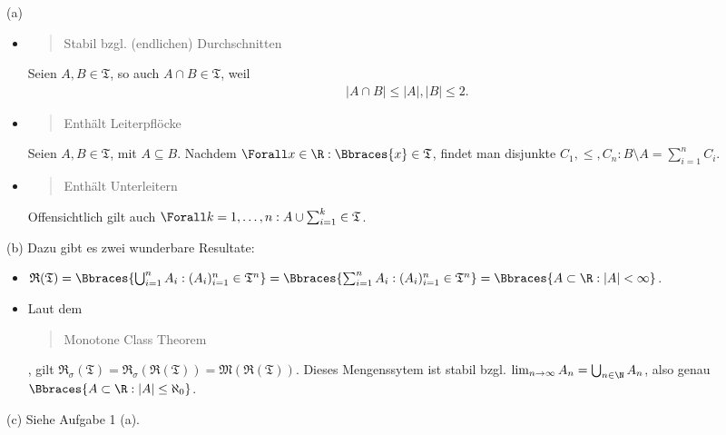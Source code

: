 \begin{solution}

(a) \phantom{}

\begin{itemize}

  \item \blockquote{Stabil bzgl. (endlichen) Durchschnitten}: Seien $A, B \in \mathfrak{T}$, so auch $A \cap B \in \mathfrak{T}$, weil
  \begin{align*}
    |A \cap B| \leq |A|, |B| \leq 2.
  \end{align*}

  \item \blockquote{Enthält Leiterpflöcke} Seien $A, B \in \mathfrak{T}$, mit $A \subseteq B$. Nachdem $\Forall x \in \R: \Bbraces{x} \in \mathfrak{T}$, findet man disjunkte $C_1, \leq, C_n: B \setminus A = \sum_{i=1}^n C_i$.

  \item \blockquote{Enthält Unterleitern} Offensichtlich gilt auch $\Forall k = 1, \ldots, n: A \cup \sum_{i=1}^k \in \mathfrak{T}$.

\end{itemize}

(b) Dazu gibt es zwei wunderbare Resultate:

\begin{itemize}

  \item $\mathfrak{R}(\mathfrak{T})
  = \Bbraces{\bigcup_{i=1}^n A_i: (A_i)_{i=1}^n \in \mathfrak{T}^n}
  = \Bbraces{\sum   _{i=1}^n A_i: (A_i)_{i=1}^n \in \mathfrak{T}^n}
  = \Bbraces{A \subset \R: |A| < \infty}$.

  \item Laut dem \blockquote{Monotone Class Theorem}, gilt
  $\mathfrak{R}_\sigma(\mathfrak{T})
  = \mathfrak{R}_\sigma(\mathfrak{R}(\mathfrak{T}))
  = \mathfrak{M}(\mathfrak{R}(\mathfrak{T}))$.
  Dieses Mengenssytem ist stabil bzgl. $\lim_{n \to \infty} A_n = \bigcup_{n \in \N} A_n$, also genau $\Bbraces{A \subset \R: |A| \leq \aleph_0}$.

\end{itemize}

(c) Siehe Aufgabe 1 (a).

\end{solution}

